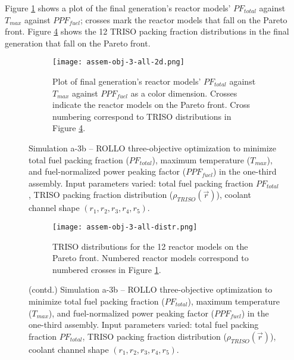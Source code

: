 Figure \ref{fig:assem-obj-3-all-2d} shows a plot of the final generation's reactor 
models' $PF_{total}$ against $T_{max}$ against $PPF_{fuel}$; crosses mark the reactor 
models that fall on the Pareto front.
Figure \ref{fig:assem-obj-3-all-distr} shows the 12 TRISO packing fraction distributions 
in the final generation that fall on the Pareto front. 
\begin{figure}[htbp!]
    \begin{subfigure}{\textwidth}
        \centering
        \texttt{[image: assem-obj-3-all-2d.png]}
        \caption{Plot of final generation's reactor models' $PF_{total}$ against 
        $T_{max}$ against $PPF_{fuel}$ as a color dimension. 
        Crosses indicate the reactor models on the 
        Pareto front. Cross numbering correspond to TRISO distributions in Figure 
        \ref{fig:assem-obj-3-all-distr}.}
        \label{fig:assem-obj-3-all-2d} 
    \end{subfigure}
    \caption{Simulation a-3b -- ROLLO three-objective optimization to minimize total 
    fuel packing fraction ($PF_{total}$), maximum temperature ($T_{max}$), and 
    fuel-normalized power peaking factor ($PPF_{fuel}$) in the one-third assembly. 
    Input parameters varied: total fuel packing fraction $PF_{total}$, 
    TRISO packing fraction distribution ($\rho_{TRISO}(\vec{r})$), 
    coolant channel shape $(r_1, r_2, r_3, r_4, r_5)$.}
    \label{fig:assem-obj-3-all}
\end{figure}
\begin{figure}[htbp!]
    \ContinuedFloat
    \begin{subfigure}{\textwidth}
        \centering
        \texttt{[image: assem-obj-3-all-distr.png]}
        \caption{TRISO distributions for the 12 reactor models on the Pareto front.
        Numbered reactor models correspond to numbered crosses in Figure 
        \ref{fig:assem-obj-3-all-2d}. }
        \label{fig:assem-obj-3-all-distr} 
    \end{subfigure}
    \caption{(contd.) Simulation a-3b -- ROLLO three-objective optimization to minimize 
    total fuel packing fraction ($PF_{total}$), maximum temperature ($T_{max}$), 
    and fuel-normalized power peaking factor ($PPF_{fuel}$) in the one-third assembly. 
    Input parameters varied: total fuel packing fraction $PF_{total}$, 
    TRISO packing fraction distribution ($\rho_{TRISO}(\vec{r})$), 
    coolant channel shape $(r_1, r_2, r_3, r_4, r_5)$.}
\end{figure}

